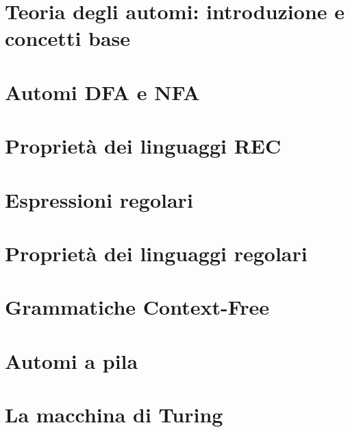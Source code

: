 \documentclass[12pt]{article}
\begin{document}


\tableofcontents
\restoregeometry

\section{Teoria degli automi: introduzione e concetti base}


\section{Automi DFA e NFA}


\section{Proprietà dei linguaggi REC}


\section{Espressioni regolari}


\section{Proprietà dei linguaggi regolari}


\section{Grammatiche Context-Free}


\section{Automi a pila}


\section{La macchina di Turing}

\end{document}
